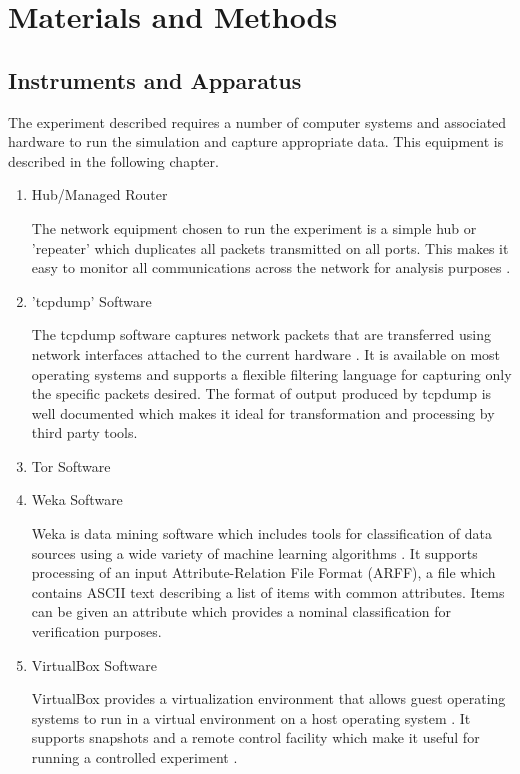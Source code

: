
\chapter{Materials and Methods}

\section{Instruments and Apparatus}

The experiment described requires a number of computer systems and associated
hardware to run the simulation and capture appropriate data. This equipment is
described in the following chapter.

\begin{enumerate}
  \item Hub/Managed Router

  The network equipment chosen to run the experiment is a simple hub or
  'repeater' which duplicates all packets transmitted on all ports. This makes it
  easy to monitor all communications across the network for analysis purposes
  \parencite{website:hub-reference}.

  \item 'tcpdump' Software

  The tcpdump software captures network packets that are transferred using
  network interfaces attached to the current hardware \parencite{:2009cr}.  It is
  available on most operating systems and supports a flexible filtering language
  for capturing only the specific packets desired. The format of output produced
  by tcpdump is well documented \parencite{:nx} which makes it ideal for
  transformation and processing by third party tools.

  \item Tor Software

  \item Weka Software

  Weka is data mining software which includes tools for classification of data
  sources using a wide variety of machine learning algorithms
  \parencite{Hall:2009p7662}. It supports processing of an input
  Attribute-Relation File Format (ARFF), a file which contains ASCII text
  describing a list of items with common attributes. Items can be given an
  attribute which provides a nominal classification for verification purposes.

  \item VirtualBox Software

  VirtualBox provides a virtualization environment that allows guest operating
  systems to run in a virtual environment on a host operating system
  \parencite{:fk}. It supports snapshots and a remote control facility which make
  it useful for running a controlled experiment \parencite{:uq}.


\end{enumerate}
